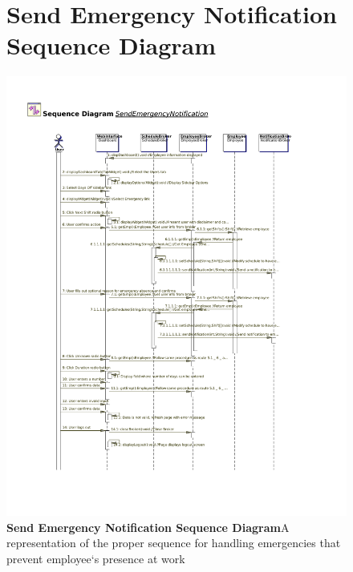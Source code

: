 \documentclass[letterpaper,12pt]{report}
\begin{document}
\begin{figure}[hbp]
 \section{Send Emergency Notification Sequence Diagram}
 \includegraphics[scale=0.65]{externals/SequenceDiagrams18.pdf}
 \caption{\small
\textbf{Send Emergency Notification Sequence Diagram}\newline A representation of the proper sequence for handling emergencies that prevent employee`s presence at work}\label{fig:seqEmergency}
\end{figure}
\newpage
\end{document}
